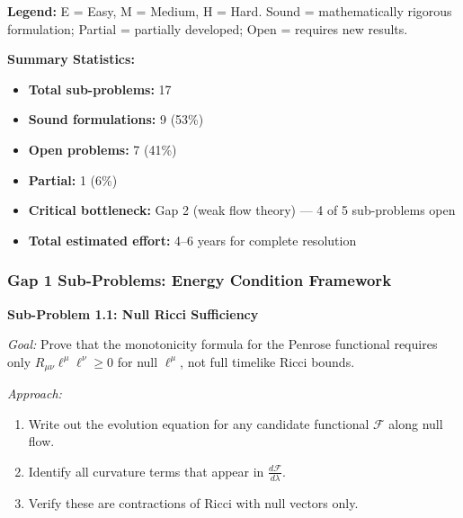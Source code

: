 \textbf{Legend:} 
E = Easy, M = Medium, H = Hard. 
Sound = mathematically rigorous formulation; 
Partial = partially developed; 
Open = requires new results.

\textbf{Summary Statistics:}
\begin{itemize}
    \item \textbf{Total sub-problems:} 17
    \item \textbf{Sound formulations:} 9 (53\%)
    \item \textbf{Open problems:} 7 (41\%)
    \item \textbf{Partial:} 1 (6\%)
    \item \textbf{Critical bottleneck:} Gap 2 (weak flow theory) --- 4 of 5 sub-problems open
    \item \textbf{Total estimated effort:} 4--6 years for complete resolution
\end{itemize}

\subsubsection{Gap 1 Sub-Problems: Energy Condition Framework}

\begin{center}
\end{center}

\textbf{Sub-Problem 1.1: Null Ricci Sufficiency}

\textit{Goal:} Prove that the monotonicity formula for the Penrose functional requires only $R_{\mu\nu}\ell^\mu\ell^\nu \geq 0$ for null $\ell^\mu$, not full timelike Ricci bounds.

\textit{Approach:}
\begin{enumerate}
    \item Write out the evolution equation for any candidate functional $\mathcal{F}$ along null flow.
    \item Identify all curvature terms that appear in $\frac{d\mathcal{F}}{d\lambda}$.
    \item Verify these are contractions of Ricci with null vectors only.
\end{enumerate}

